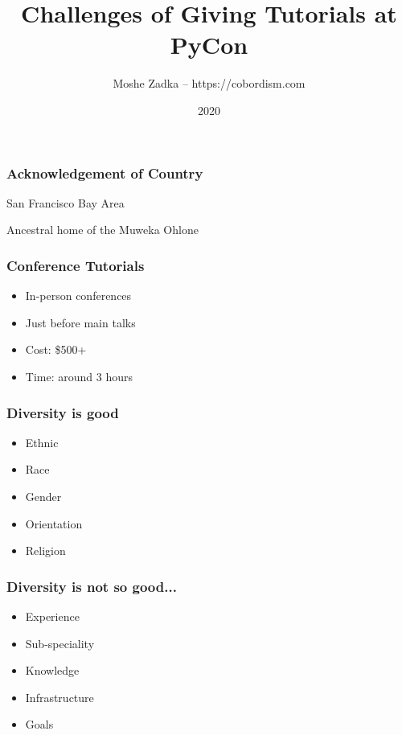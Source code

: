 \usepackage{listings}
\usepackage{textcomp}
\usepackage{fancyvrb}

\title{Challenges of Giving Tutorials at PyCon}
\author{Moshe Zadka -- https://cobordism.com}
\date{2020}


\begin{titlepage}
\maketitle
\end{titlepage}

\frame{\titlepage}

\begin{frame}
\frametitle{Acknowledgement of Country}

San Francisco Bay Area

Ancestral home of the Muweka Ohlone
\end{frame}

\begin{frame}
\frametitle{Conference Tutorials}

\begin{itemize}
\item In-person conferences
\item Just before main talks
\item Cost: \$500+
\item Time: around 3 hours
\end{itemize}
\end{frame}

\begin{frame}
\frametitle{Diversity is good}

\begin{itemize}
\item Ethnic
\item Race
\item Gender
\item Orientation
\item Religion
\end{itemize}
\end{frame}

\begin{frame}
\frametitle{Diversity is not so good...}

\begin{itemize}
\item Experience
\item Sub-speciality
\item Knowledge
\item Infrastructure
\item Goals
\end{itemize}

\end{frame}

